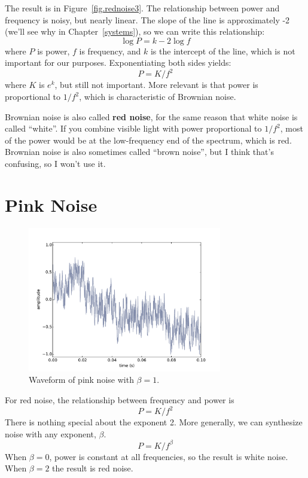 \documentclass[12pt]{book}
\begin{document}
The result is in Figure~\ref{fig.rednoise3}.  The relationship between
power and frequency is noisy, but nearly linear.  
The slope of the line is approximately -2 (we'll see why in
Chapter~\ref{systems}), so we can write this relationship:
%
\[ \log P = k -2 \log f \]
%
where $P$ is power, $f$ is frequency, and $k$ is the intercept
of the line, which is not important for our purposes.
Exponentiating both sides yields:
%
\[ P = K / f^{2} \]
%
where $K$ is $e^k$, but still not important.  More relevant is
that power is proportional to $1/f^2$, which is characteristic
of Brownian noise.

Brownian noise is also called {\bf red noise}, for the same reason that
white noise is called ``white''.  If you combine visible light with
power proportional to $1/f^2$, most of the power
would be at the low-frequency end of the spectrum, which is red.
Brownian noise is also sometimes called ``brown noise'', but I think
that's confusing, so I won't use it.



\section{Pink Noise}
\label{pink}

\begin{figure}
\centerline{\includegraphics[height=2.5in]{figs/pinknoise0.pdf}}
\caption{Waveform of pink noise with $\beta=1$.}
\label{fig.pinknoise0}
\end{figure}

For red noise, the relationship between frequency
and power is
%
\[ P = K / f^{2} \]
%
There is nothing special about the exponent 2.  More generally,
we can synthesize noise with any exponent, $\beta$.
%
\[ P = K / f^{\beta} \]
%
When $\beta = 0$, power is constant at all frequencies,
so the result is white noise.  When $\beta=2$ the result is red noise.
\end{document}
